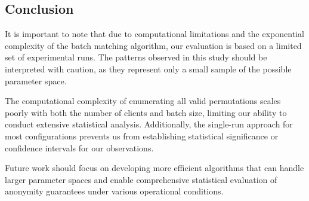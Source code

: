 \documentclass{article}
\begin{document}
\subsection{Conclusion}
It is important to note that due to computational limitations 
and the exponential complexity of the batch matching algorithm, 
our evaluation is based on a limited set of experimental runs. 
The patterns observed in this study should be interpreted with 
caution, as they represent only a small sample of the possible 
parameter space.

The computational complexity of enumerating all valid permutations 
scales poorly with both the number of clients and batch size, 
limiting our ability to conduct extensive statistical analysis. 
Additionally, the single-run approach for most configurations 
prevents us from establishing statistical significance or 
confidence intervals for our observations.

Future work should focus on developing more efficient algorithms 
that can handle larger parameter spaces and enable comprehensive 
statistical evaluation of anonymity guarantees under various 
operational conditions.
\end{document}
